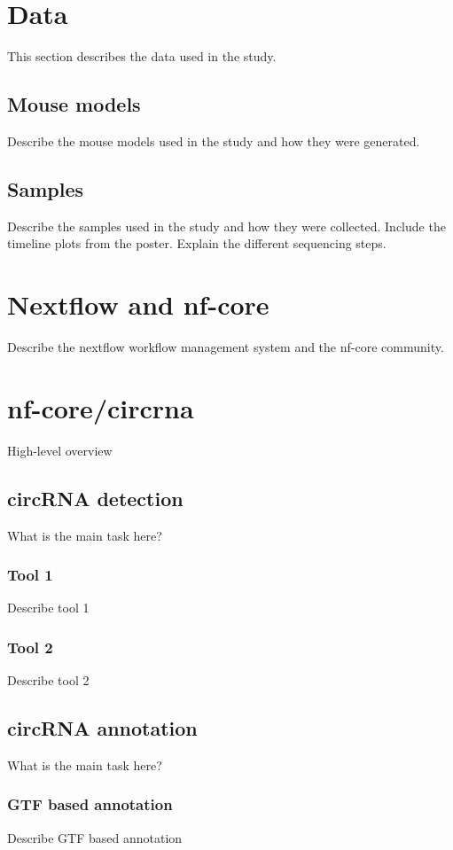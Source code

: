 \section{Data}
This section describes the data used in the study.

\subsection{Mouse models}
Describe the mouse models used in the study and how they were generated.

\subsection{Samples}
Describe the samples used in the study and how they were collected.
Include the timeline plots from the poster.
Explain the different sequencing steps.

\section{Nextflow and nf-core}
Describe the nextflow workflow management system and the nf-core community.

\section{nf-core/circrna}
High-level overview

\subsection{circRNA detection}
What is the main task here?

\subsubsection{Tool 1}
Describe tool 1

\subsubsection{Tool 2}
Describe tool 2

\subsection{circRNA annotation}
What is the main task here?

\subsubsection{GTF based annotation}
Describe GTF based annotation

